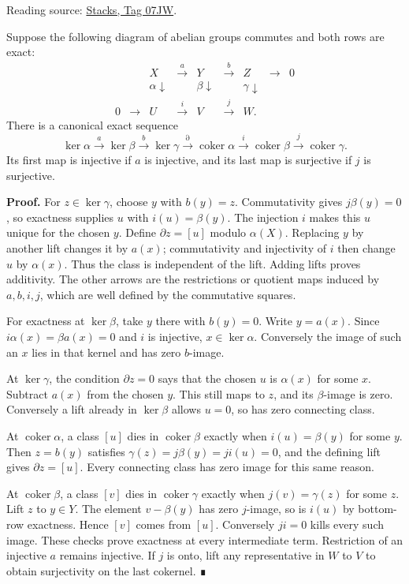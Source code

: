 \documentclass[11pt,a4paper,openany]{report}
\begin{document}
Reading source: \href{https://stacks.math.columbia.edu/tag/07JW}{Stacks, Tag 07JW}.

Suppose the following diagram of abelian groups commutes and both rows are exact: \[
\begin{array}{ccccccccc}
&&X&\xrightarrow{a}&Y&\xrightarrow{b}&Z&\longrightarrow&0\\
&&\alpha\downarrow&&\beta\downarrow&&\gamma\downarrow\\
0&\longrightarrow&U&\xrightarrow{i}&V&\xrightarrow{j}&W.
\end{array}
\] There is a canonical exact sequence \[
\ker\alpha\xrightarrow{a}\ker\beta\xrightarrow{b}\ker\gamma
\xrightarrow{\partial}\operatorname{coker}\alpha
\xrightarrow{i}\operatorname{coker}\beta
\xrightarrow{j}\operatorname{coker}\gamma.
\] Its first map is injective if \(a\) is injective, and its last map is surjective if \(j\) is surjective.

\textbf{Proof.} For \(z\in\ker\gamma\), choose \(y\) with \(b(y)=z\). Commutativity gives \(j\beta(y)=0\), so exactness supplies \(u\) with \(i(u)=\beta(y)\). The injection \(i\) makes this \(u\) unique for the chosen \(y\). Define \(\partial z=[u]\) modulo \(\alpha(X)\). Replacing \(y\) by another lift changes it by \(a(x)\); commutativity and injectivity of \(i\) then change \(u\) by \(\alpha(x)\). Thus the class is independent of the lift. Adding lifts proves additivity. The other arrows are the restrictions or quotient maps induced by \(a,b,i,j\), which are well defined by the commutative squares.

For exactness at \(\ker\beta\), take \(y\) there with \(b(y)=0\). Write \(y=a(x)\). Since \(i\alpha(x)=\beta a(x)=0\) and \(i\) is injective, \(x\in\ker\alpha\). Conversely the image of such an \(x\) lies in that kernel and has zero \(b\)-image.

At \(\ker\gamma\), the condition \(\partial z=0\) says that the chosen \(u\) is \(\alpha(x)\) for some \(x\). Subtract \(a(x)\) from the chosen \(y\). This still maps to \(z\), and its \(\beta\)-image is zero. Conversely a lift already in \(\ker\beta\) allows \(u=0\), so has zero connecting class.

At \(\operatorname{coker}\alpha\), a class \([u]\) dies in \(\operatorname{coker}\beta\) exactly when \(i(u)=\beta(y)\) for some \(y\). Then \(z=b(y)\) satisfies \(\gamma(z)=j\beta(y)=ji(u)=0\), and the defining lift gives \(\partial z=[u]\). Every connecting class has zero image for this same reason.

At \(\operatorname{coker}\beta\), a class \([v]\) dies in \(\operatorname{coker}\gamma\) exactly when \(j(v)=\gamma(z)\) for some \(z\). Lift \(z\) to \(y\in Y\). The element \(v-\beta(y)\) has zero \(j\)-image, so is \(i(u)\) by bottom-row exactness. Hence \([v]\) comes from \([u]\). Conversely \(ji=0\) kills every such image. These checks prove exactness at every intermediate term. Restriction of an injective \(a\) remains injective. If \(j\) is onto, lift any representative in \(W\) to \(V\) to obtain surjectivity on the last cokernel. ∎
\end{document}
